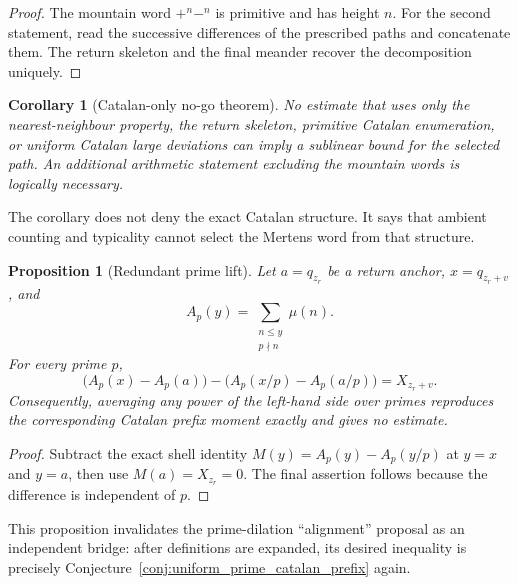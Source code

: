 \documentclass[11pt]{amsart}
\numberwithin{equation}{section}
\theoremstyle{plain}
\newtheorem{proposition}[theorem]{Proposition}
\newtheorem{corollary}[theorem]{Corollary}
\theoremstyle{definition}
\theoremstyle{remark}
\newcommand{\Mob}{\mu}
\newcommand{\Mert}{M}
\begin{document}
\begin{proof}
The mountain word $+^n-^n$ is primitive and has height $n$.  For the second
statement, read the successive differences of the prescribed paths and
concatenate them.  The return skeleton and the final meander recover the
decomposition uniquely.
\end{proof}

\begin{corollary}[Catalan-only no-go theorem]
\label{cor:catalan_only_no_go}
No estimate that uses only the nearest-neighbour property, the return
skeleton, primitive Catalan enumeration, or uniform Catalan large deviations
can imply a sublinear bound for the selected path.  An additional arithmetic
statement excluding the mountain words is logically necessary.
\end{corollary}

The corollary does not deny the exact Catalan structure.  It says that ambient
counting and typicality cannot select the Mertens word from that structure.

\begin{proposition}[Redundant prime lift]
\label{prop:redundant_prime_lift}
Let $a=q_{z_r}$ be a return anchor, $x=q_{z_r+v}$, and
\begin{equation}
A_p(y)=\sum_{\substack{n\leq y\\p\nmid n}}\Mob(n).
\end{equation}
For every prime $p$,
\begin{equation}
\bigl(A_p(x)-A_p(a)\bigr)
-\bigl(A_p(x/p)-A_p(a/p)\bigr)
=X_{z_r+v}.
\label{eq:redundant_prime_lift}
\end{equation}
Consequently, averaging any power of the left-hand side over primes reproduces
the corresponding Catalan prefix moment exactly and gives no estimate.
\end{proposition}

\begin{proof}
Subtract the exact shell identity
$\Mert(y)=A_p(y)-A_p(y/p)$ at $y=x$ and $y=a$, then use
$\Mert(a)=X_{z_r}=0$.  The final assertion follows because the difference is
independent of $p$.
\end{proof}

This proposition invalidates the prime-dilation ``alignment'' proposal as an
independent bridge: after definitions are expanded, its desired inequality is
precisely Conjecture~\ref{conj:uniform_prime_catalan_prefix} again.
\end{document}

